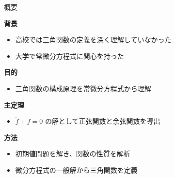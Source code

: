 \documentclass[aspectratio=169]{beamer}
\newenvironment{sectionblock}[1]{%
  \begin{minipage}{\textwidth}%
    \textbf{\large #1}\par\vspace{0.5em}%
}{%
  \end{minipage}\vspace{1em}%
}
\newcommand{\sectioncontent}[2]{%
  \begin{sectionblock}{#1}%
    \begin{itemize}%
      #2%
    \end{itemize}%
  \end{sectionblock}%
}
\begin{document}
\begin{frame}{概要}

\sectioncontent{背景}{
  \item 高校では三角関数の定義を深く理解していなかった
  \item 大学で常微分方程式に関心を持った
}

\sectioncontent{目的}{
  \item 三角関数の構成原理を常微分方程式から理解
}

\sectioncontent{主定理}{
  \item $\ddot{f} + f = 0$ の解として正弦関数と余弦関数を導出
}

\sectioncontent{方法}{
  \item 初期値問題を解き、関数の性質を解析
  \item 微分方程式の一般解から三角関数を定義
}

\end{frame}
\end{document}
